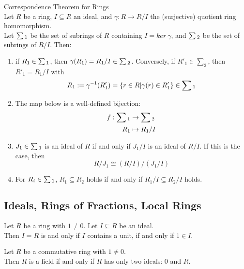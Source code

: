 \begin{definition}
 Correspondence Theorem for Rings\\
Let $R$ be a ring, $I \subseteq R$ an ideal, and $\gamma: R \rightarrow R/I$ the (surjective) quotient ring homomorphism.\\
Let $\sum \textsubscript{1}$ be the set of subrings of $R$ containing $I = ker \ \gamma$, and $\sum \textsubscript{2}$ be the set of subrings of $R/I$. Then:
\begin{enumerate}[label=(\roman*)]
\item if $R_1 \in \sum \textsubscript{1}$, then $\gamma(R_1) = R_1/I \in \sum \textsubscript{2}$. Conversely, if $R'_1 \in \sum_2$, then  $R'_1 = R_1/I$ with
\begin{equation}
R_1:=\gamma^{-1}(R'_1) = \{r\in R | \gamma(r) \in R'_1\} \in \sum \textsubscript{1} \nonumber
\end{equation}
\item The map below is a well-defined bijection:
\begin{align}
f: \sum \textsubscript{1} &\rightarrow \sum \textsubscript{2} \nonumber \\
R_1 &\mapsto R_1/I \nonumber
\end{align}
\item $J_1 \in \sum \textsubscript{1}$ is an ideal of $R$ if and only if $J_1/I$ is an ideal of $R/I$. If this is the case, then 
\begin{equation}
R/J_1 \cong (R/I)/(J_1/I) \nonumber
\end{equation} 
\item For $R_i \in \sum \textsubscript{1}$, $R_1 \subseteq R_2$ holds if and only if $R_1/I \subseteq R_2/I$ holds.
\end{enumerate}
\end{definition}

\subsection{Ideals, Rings of Fractions, Local Rings}

\begin{proposition}
Let $R$ be a ring with $1 \neq 0$. Let $I \subseteq R$ be an ideal.\\
Then $I=R$ is and only if $I$ contains a unit, if and only if $1 \in I$.
\end{proposition}

\begin{proposition}
Let $R$ be a commutative ring with $1 \neq 0$.\\
Then $R$ is a field if and only if $R$ has only two ideals: $0$ and $R$.
\end{proposition}

